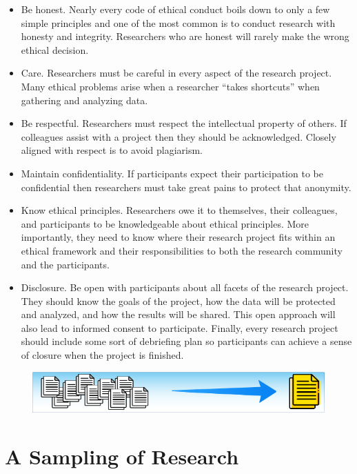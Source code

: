 \begin{itemize}

	\item Be honest. Nearly every code of ethical conduct boils down to only a few simple principles and one of the most common is to conduct research with honesty and integrity. Researchers who are honest will rarely make the wrong ethical decision.
	\item Care. Researchers must be careful in every aspect of the research project. Many ethical problems arise when a researcher ``takes shortcuts'' when gathering and analyzing data.
	\item Be respectful. Researchers must respect the intellectual property of others. If colleagues assist with a project then they should be acknowledged. Closely aligned with respect is to avoid plagiarism.
	\item Maintain confidentiality. If participants expect their participation to be confidential then researchers must take great pains to protect that anonymity.  
	\item Know ethical principles. Researchers owe it to themselves, their colleagues, and participants to be knowledgeable about ethical principles. More importantly, they need to know where their research project fits within an ethical framework and their responsibilities to both the research community and the participants.
	\item Disclosure. Be open with participants about all facets of the research project. They should know the goals of the project, how the data will be protected and analyzed, and how the results will be shared. This open approach will also lead to informed consent to participate. Finally, every research project should include some sort of debriefing plan so participants can achieve a sense of closure when the project is finished.
\end{itemize}

\begin{figure}[H]
	\centering
	\includegraphics[width=\maxwidth{.95\linewidth}]{gfx/Sampling_Of_Research}
	\caption*{}
	\label{03:sampling_of_research}
\end{figure}
\section{A Sampling of Research}

